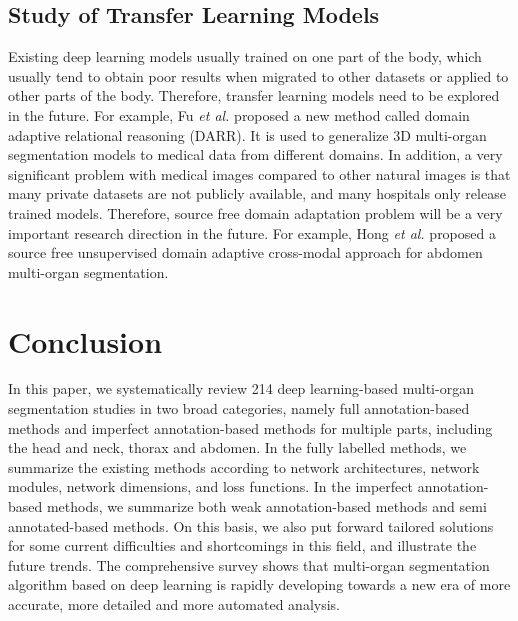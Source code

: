 \documentclass[lettersize,journal]{IEEEtran}
\begin{document}
\subsection{Study of Transfer Learning Models}
\label{sec6_4}
Existing deep learning models usually trained on one part of the body, which usually tend to obtain poor results when migrated to other datasets or applied to other parts of the body. Therefore, transfer learning models need to be explored in the future. For example, Fu {\it{et al.}} \cite{65} proposed a new method called domain adaptive relational reasoning (DARR). It is used to generalize 3D multi-organ segmentation models to medical data from different domains. In addition, a very significant problem with medical images compared to other natural images is that many private datasets are not publicly available, and many hospitals only release trained models. Therefore, source free domain adaptation problem will be a very important research direction in the future. For example, Hong {\it{et al.}} \cite{81} proposed a source free unsupervised domain adaptive cross-modal approach for abdomen multi-organ segmentation.

\section{Conclusion}
\label{sec7}
In this paper, we systematically review 214 deep learning-based multi-organ segmentation studies in two broad categories, namely full annotation-based methods and imperfect annotation-based methods for multiple parts, including the head and neck, thorax and abdomen. In the fully labelled methods, we summarize the existing methods according to network architectures, network modules, network dimensions, and loss functions. In the imperfect annotation-based methods, we summarize both weak annotation-based methods and semi annotated-based methods. On this basis, we also put forward tailored solutions for some current difficulties and shortcomings in this field, and illustrate the future trends. The comprehensive survey shows that multi-organ segmentation algorithm based on deep learning is rapidly developing towards a new era of more accurate, more detailed and more automated analysis.






\end{document}

